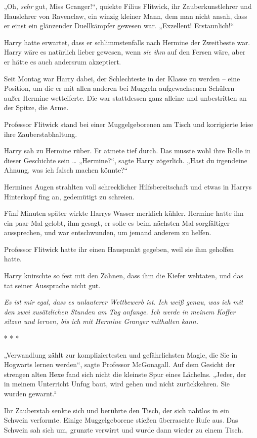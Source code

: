 {„Oh, \emph{sehr} gut, Miss Granger!“, quiekte Filius Flitwick, ihr Zauberkunstlehrer und Hauslehrer von Ravenclaw, ein winzig kleiner Mann, dem man nicht ansah, dass er einst ein glänzender Duellkämpfer gewesen war. „Exzellent! Erstaunlich!“

Harry hatte erwartet, dass er schlimmstenfalls nach Hermine der Zweitbeste war. Harry wäre es natürlich lieber gewesen, wenn \emph{sie ihm} auf den Fersen wäre, aber er hätte es auch andersrum akzeptiert.

Seit Montag war Harry dabei, der Schlechteste in der Klasse zu werden -- eine Position, um die er mit allen anderen bei Muggeln aufgewachsenen Schülern außer Hermine wetteiferte. Die war stattdessen ganz alleine und unbestritten an der Spitze, die Arme.

Professor Flitwick stand bei einer Muggelgeborenen am Tisch und korrigierte leise ihre Zauberstabhaltung.

Harry sah zu Hermine rüber. Er atmete tief durch. Das musste wohl ihre Rolle in dieser Geschichte sein … „Hermine?“, sagte Harry zögerlich. „Hast du irgendeine Ahnung, was ich falsch machen könnte?“

Hermines Augen strahlten voll schrecklicher Hilfsbereitschaft und etwas in Harrys Hinterkopf fing an, gedemütigt zu schreien.

Fünf Minuten später wirkte Harrys Wasser merklich kühler. Hermine hatte ihn ein paar Mal gelobt, ihm gesagt, er solle es beim nächsten Mal sorgfältiger aussprechen, und war entschwunden, um jemand anderem zu helfen.

Professor Flitwick hatte ihr einen Hauspunkt gegeben, weil sie ihm geholfen hatte.

Harry knirschte so fest mit den Zähnen, dass ihm die Kiefer wehtaten, und das tat seiner Aussprache nicht gut.

\emph{Es ist mir egal, dass es unlauterer Wettbewerb ist. Ich weiß genau, was ich mit den zwei zusätzlichen Stunden am Tag anfange. Ich werde in meinem Koffer sitzen und lernen, bis ich mit Hermine Granger mithalten kann.}

* * *

„Verwandlung zählt zur kompliziertesten und gefährlichsten Magie, die Sie in Hogwarts lernen werden“, sagte Professor McGonagall. Auf dem Gesicht der strengen alten Hexe fand sich nicht die kleinste Spur eines Lächelns. „Jeder, der in meinem Unterricht Unfug baut, wird gehen und nicht zurückkehren. Sie wurden gewarnt.“

Ihr Zauberstab senkte sich und berührte den Tisch, der sich nahtlos in ein Schwein verformte. Einige Muggelgeborene stießen überraschte Rufe aus. Das Schwein sah sich um, grunzte verwirrt und wurde dann wieder zu einem Tisch.

}

